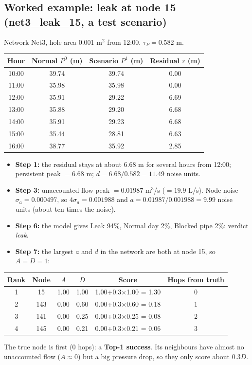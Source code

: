 \documentclass[11pt,a4paper]{article}
\begin{document}
\subsection{Worked example: leak at node 15 (net3\_leak\_15, a test scenario)}\label{sec:example}
Network Net3, hole area 0.001 m$^2$ from 12:00. $\tau_P=0.582$ m.
\begin{center}\small\begin{tabular}{@{}cccc@{}}\toprule
Hour & Normal $P^0$ (m) & Scenario $P^1$ (m) & Residual $r$ (m) \\\midrule
10:00 & 39.74 & 39.74 & 0.00 \\
11:00 & 35.98 & 35.98 & 0.00 \\
12:00 & 35.91 & 29.22 & 6.69 \\
13:00 & 35.88 & 29.20 & 6.68 \\
14:00 & 35.91 & 29.23 & 6.68 \\
15:00 & 35.44 & 28.81 & 6.63 \\
16:00 & 38.77 & 35.92 & 2.85 \\
\bottomrule\end{tabular}\end{center}
\begin{itemize}
\item \textbf{Step 1:} the residual stays at about 6.68 m for several hours from 12:00; persistent peak $=6.68$ m; $d=6.68/0.582=11.49$ noise units.
\item \textbf{Step 3:} unaccounted flow peak $=0.01987$ m$^3$/s ($=19.9$ L/s). Node noise $\sigma_a=0.000497$, so $4\sigma_a=0.001988$ and $a=0.01987/0.001988=9.99$ noise units (about ten times the noise).
\item \textbf{Step 6:} the model gives Leak 94\%, Normal day 2\%, Blocked pipe 2\%: verdict \emph{leak}.
\item \textbf{Step 7:} the largest $a$ and $d$ in the network are both at node 15, so $A=D=1$:
\end{itemize}
\begin{center}\small\begin{tabular}{@{}cccccc@{}}\toprule
Rank & Node & $A$ & $D$ & Score & Hops from truth \\\midrule
1 & 15 & 1.00 & 1.00 & 1.00+0.3$\times$1.00 = 1.30 & 0 \\
2 & 143 & 0.00 & 0.60 & 0.00+0.3$\times$0.60 = 0.18 & 1 \\
3 & 141 & 0.00 & 0.25 & 0.00+0.3$\times$0.25 = 0.08 & 2 \\
4 & 145 & 0.00 & 0.21 & 0.00+0.3$\times$0.21 = 0.06 & 3 \\
\bottomrule\end{tabular}\end{center}
The true node is first (0 hops): a \textbf{Top-1 success}. Its neighbours have almost no unaccounted flow ($A\approx0$) but a big pressure drop, so they only score about $0.3D$.
\end{document}

